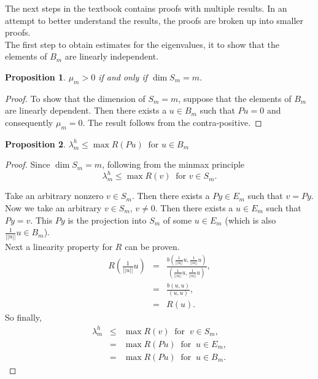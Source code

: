 \documentclass[../../main.tex]{subfiles}
\begin{document}
The next steps in the textbook \cite{SF73} contains proofs with multiple results. In an attempt to better understand the results, the proofs are broken up into smaller proofs.\\

The first step to obtain estimates for the eigenvalues, it to show that the elements of $B_m$ are linearly independent.

\newtheorem{Prop_1}{Proposition}
\begin{Prop_1}
 $\mu_{m} > 0$ if and only if $\dim S_{m} = m$.
\end{Prop_1}
\begin{proof}
	To show that the dimension of $S_m = m$, suppose that the elements of $B_m$ are linearly dependent. Then there exists a $u \in B_m$ such that $Pu = 0$ and consequently $\mu_m = 0$. The result follows from the contra-positive.
\end{proof}

\newtheorem{Prop_2}[Prop_1]{Proposition}
\begin{Prop_2}
	$\lambda^{h}_{m} \leq \max R(Pu) \ \text{ for } u \in B_{m}$\\
\end{Prop_2}
\begin{proof}
	Since $\dim S_{m} = m$, following from the minmax principle
	\begin{equation*}
		\lambda_m^h \leq \max R(v) \ \text{ for } v \in S_m.
	\end{equation*}

	Take an arbitrary nonzero $v \in S_m$. Then there exists a $Py \in E_m$ such that $v = Py$.\\
 
	Now we take an arbitrary $v \in S_{m}$, $v \neq 0$. Then there exists a $u \in E_{m}$ such that $Py = v$. This $Py$ is the projection into $S_m$ of some $u \in E_m$ (which is also $\displaystyle \frac{1}{||u||}u \in B_m$).\\
	
	Next a linearity property for $R$ can be proven. 
	\begin{eqnarray*}
	R(\frac{1}{||u||}u) &=& \frac{b\left(\frac{1}{||u||}u,\frac{1}{||u||}u\right)}{\left(\frac{1}{||u||}u,\frac{1}{||u||}u\right)},\\
						&=& \frac{b(u,u)}{(u,u)},\\
						&=& R(u).
	\end{eqnarray*}
	So finally,
	\begin{eqnarray*}
	\lambda_{m}^{h} &\leq & \max R(v) \ \text{ for } \ v \in S_{m},\\
						&=& \max R(Pu) \ \text{ for } \ u \in E_{m},\\
						&=& \max R(Pu) \ \text{ for } \ u \in B_{m}.
	\end{eqnarray*}
\end{proof}
\end{document}
